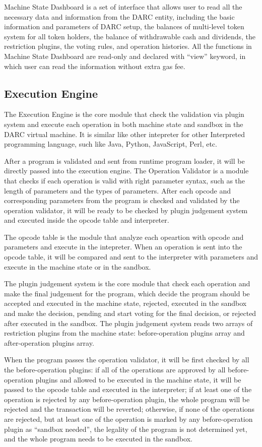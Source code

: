 \documentclass[main.tex]{subfiles}
\begin{document}
Machine State Dashboard is a set of interface that allows user to read all the necessary data and information from the DARC entity, including the basic information and parameters of DARC setup, the balances of multi-level token system for all token holders, the balance of withdrawable cash and dividends, the restriction plugins, the voting rules, and operation histories. All the functions in Machine State Dashboard are read-only and declared with ``view'' keyword, in which user can read the information without extra gas fee.

\subsection{Execution Engine}

The Execution Engine is the core module that check the validation via plugin system and execute each operation in both machine state and sandbox in the DARC virtual machine. It is similar like other intepreter for other Interpreted programming language, such like Java, Python, JavaScript, Perl, etc. 

After a program is validated and sent from runtime program loader, it will be directly passed into the execution engine. The Operation Validator is a module that checks if each operation is valid with right parameter syntax, such as the length of parameters and the types of parameters. After each opcode and corresponding parameters from the program is checked and validated by the operation validator, it will be ready to be checked by plugin judgement system and executed inside the opcode table and interpreter.

The opcode table is the module that analyze each opeartion with opcode and parameters and execute in the intepreter. When an operation is sent into the opcode table, it will be compared and sent to the interpreter with parameters and execute in the machine state or in the sandbox.

The plugin judgement system is the core module that check each operation and make the final judgement for the program, which decide the program should be accepted and executed in the machine state, rejected, executed in the sandbox and make the decision, pending and start voting for the final decision, or rejected after executed in the sandbox. The plugin judgement system reads two arrays of restriction plugins from the machine state: before-operation plugins array and after-operation plugins array. 

When the program passes the operation validator, it will be first checked by all the before-operation plugins: if all of the operations are approved by all before-operation plugins and allowed to be executed in the machine state, it will be passed to the opcode table and executed in the interpreter; if at least one of the operation is rejected by any before-operation plugin, the whole program will be rejected and the transaction will be reverted; otherwise, if none of the operations are rejected, but at least one of the operation is marked by any before-operation plugin as ``sandbox needed'', the legality of the program is not determined yet, and the whole program needs to be executed in the sandbox. 
\end{document}
